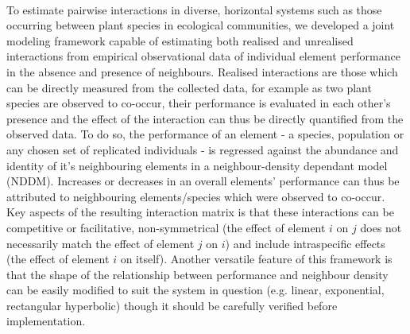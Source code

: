 \documentclass[a4,12pt]{article}
\begin{document}
    \paragraph{}
        To estimate pairwise interactions in diverse, horizontal systems such as those occurring between plant species in ecological communities, we developed a joint modeling framework capable of estimating both realised and unrealised interactions from empirical observational data of individual element performance in the absence and presence of neighbours. Realised interactions are those which can be directly measured from the collected data, for example as two plant species are observed to co-occur, their performance is evaluated in each other's presence and the effect of the interaction can thus be directly quantified from the observed data. To do so, the performance of an element - a species, population or any chosen set of replicated individuals - is regressed against the abundance and identity of it's neighbouring elements in a neighbour-density dependant model (NDDM).  Increases or decreases in an overall elements' performance can thus be attributed to neighbouring elements/species which were observed to co-occur. Key aspects of the resulting interaction matrix is that these interactions can be competitive or facilitative, non-symmetrical (the effect of element $i$ on $j$ does not necessarily match the effect of element $j$ on $i$) and include intraspecific effects (the effect of element $i$ on itself). Another versatile feature of this framework is that the shape of the relationship between performance and neighbour density can be easily modified to suit the system in question (e.g. linear, exponential, rectangular hyperbolic) though it should be carefully verified before implementation. 
\end{document}
